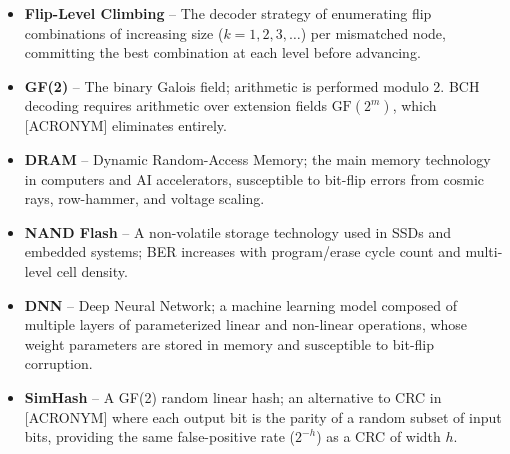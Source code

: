 \begin{itemize}
    \item \textbf{Flip-Level Climbing} -- The decoder strategy of enumerating flip combinations of increasing size ($k = 1, 2, 3, \ldots$) per mismatched node, committing the best combination at each level before advancing.
    \item \textbf{GF(2)} -- The binary Galois field; arithmetic is performed modulo 2. BCH decoding requires arithmetic over extension fields $\text{GF}(2^m)$, which [ACRONYM] eliminates entirely.
    \item \textbf{DRAM} -- Dynamic Random-Access Memory; the main memory technology in computers and AI accelerators, susceptible to bit-flip errors from cosmic rays, row-hammer, and voltage scaling.
    \item \textbf{NAND Flash} -- A non-volatile storage technology used in SSDs and embedded systems; BER increases with program/erase cycle count and multi-level cell density.
    \item \textbf{DNN} -- Deep Neural Network; a machine learning model composed of multiple layers of parameterized linear and non-linear operations, whose weight parameters are stored in memory and susceptible to bit-flip corruption.
    \item \textbf{SimHash} -- A GF(2) random linear hash; an alternative to CRC in [ACRONYM] where each output bit is the parity of a random subset of input bits, providing the same false-positive rate ($2^{-h}$) as a CRC of width $h$.
\end{itemize}
